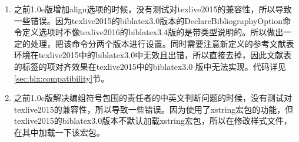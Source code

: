 \begin{enumerate}
\item 之前1.0e版增加align选项的时候，没有测试对texlive2015的兼容性，所以导致一些错误。因为texlive2015的biblatex3.0版本的DeclareBibliographyOption命令定义选项时不像texlive2016的biblatex3.4版的是带类型说明的。所以做出一定的处理，把该命令分两个版本进行设置。同时需要注意新定义的参考文献表环境在texlive2015中的biblatex3.0中无效且出错，所以直接去掉，因此文献表的标签的项对齐效果在texlive2015中的biblatex3.0 版中无法实现。代码详见\ref{sec:blx:compatibility}节。

\item 之前1.0e版解决编组符号包围的责任者的中英文判断问题的时候，没有测试对texlive2015的兼容性，所以导致一些错误。因为使用了xstring宏包的功能，但texlive2015的biblatex3.0版本不默认加载xstring宏包，所以在修改样式文件，在其中加载一下该宏包。
\begin{texlist}
\RequirePackage{xstring}%
\end{texlist}

\end{enumerate}


